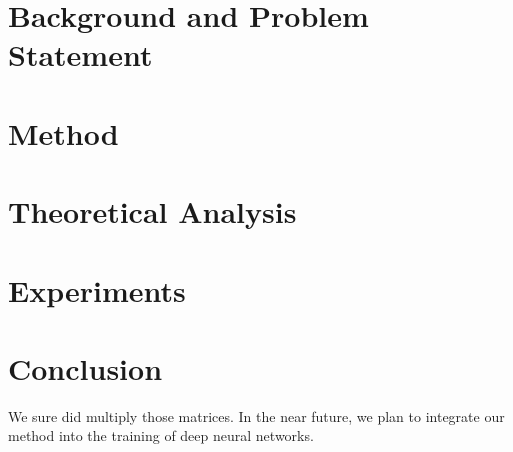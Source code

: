 \documentclass{article}  %
\begin{document}


\section{Background and Problem Statement}



\section{Method}



\section{Theoretical Analysis}



\section{Experiments}




% 


\section{Conclusion}

We sure did multiply those matrices. In the near future, we plan to integrate our method into the training of deep neural networks.
\end{document}
